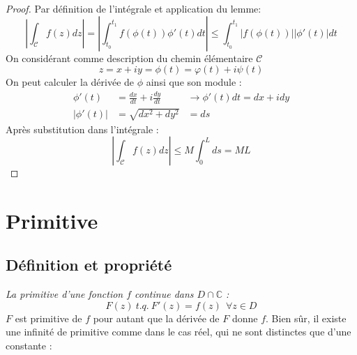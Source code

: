     \begin{proof}
    Par définition de l'intégrale et application du lemme:
    \begin{equation}
    \left|\int_\mathcal{C} f(z) dz\right| = \left|\int_{t_0}^{t_1} f(\phi(t))\phi'(t)
    dt\right| \leq \int_{t_0}^{t_1} |f(\phi(t))||\phi'(t)| dt
    \end{equation}
    On considérant comme description du chemin élémentaire $\mathcal{C}$ 
    \begin{equation}
    z = x+iy = \phi(t) = \varphi(t) + i\psi(t)
    \end{equation}
    On peut calculer la dérivée de $\phi$ ainsi que son module : 
    \begin{equation}
    \begin{array}{lll}
    \phi'(t) &= \frac{dx}{dt} + i\frac{dy}{dt} &\rightarrow \phi'(t)dt= dx + idy\\
    |\phi'(t)| &= \sqrt{dx^2 + dy^2}  &= ds
    \end{array}
    \end{equation}
    Après substitution dans l'intégrale :
    \begin{equation}
     \left|\int_\mathcal{C} f(z) dz\right| \leq M\int_0^L ds = ML
    \end{equation}
    \end{proof}
    
    
    
    
    
    
\section{Primitive}
    \subsection{Définition et propriété}
    \textit{La primitive d'une fonction $f$ continue dans $D \cap \mathbb{C}$ :}
    \begin{equation}
    F(z)\ t.q.\ F'(z) = f(z)\ \ \forall z \in D
    \end{equation}
    $F$ est primitive de $f$ pour autant que la dérivée de $F$ donne $f$. Bien sûr,
    il existe une infinité de primitive comme dans le cas réel, qui ne sont distinctes
    que d'une constante :\\
    
